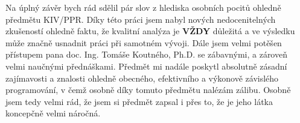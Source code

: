 \documentclass[12pt, a4paper]{article}
\begin{document}
Na úplný závěr bych rád sdělil pár slov z hlediska osobních pocitů ohledně předmětu KIV/PPR. 
Díky této práci jsem nabyl nových nedocenitelných zkušeností ohledně faktu, že kvalitní analýza je \textbf{VŽDY} důležitá a ve výsledku může značně usnadnit práci při samotném vývoji.
Dále jsem velmi potěšen přístupem pana doc. Ing. Tomáše Koutného, Ph.D. se zábavnými, a zároveň velmi naučnými přednáškami.
Předmět mi nadále poskytl absolutně zásadní zajímavosti a znalosti ohledně obecného, efektivního a výkonově závislého programování, v čemž osobně díky tomuto předmětu nalézám zálibu. 
Osobně jsem tedy velmi rád, že jsem si předmět zapsal i přes to, že je jeho látka koncepčně velmi náročná.  


\newpage

{\raggedright\small

}
\end{document}

